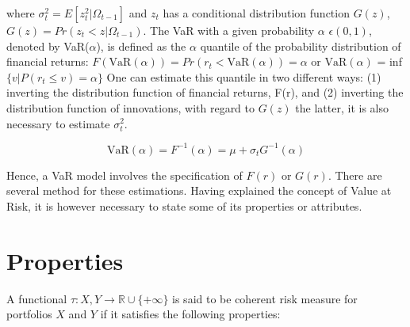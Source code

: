 \documentclass[a4paper,11pt,oneside]{book}
\begin{document}
where $\sigma^2_t = E[z^2_t|\Omega_{t-1}]$ and $z_t$ has a conditional distribution function $G(z)$, $G(z) = Pr(z_t < z|\Omega_{t-1})$. The VaR with a given probability $\alpha$ $\epsilon(0,1)$, denoted by VaR($\alpha$), is defined as the $\alpha$ quantile of the probability distribution of financial returns:\newline
$F(\text{VaR}(\alpha))=Pr(r_t < \text{VaR}(\alpha))=\alpha$ or $\text{VaR}(\alpha)$ = inf$\{v|P(r_t \leq v)= \alpha\}$
\newline\newline
One can estimate this quantile in two different ways: (1) inverting the distribution function of financial returns, F(r), and (2)
inverting the distribution function of innovations, with regard to
$G(z)$ the latter, it is also necessary to estimate $\sigma^2_t$.

\begin{equation}
\text{VaR} (\alpha) = F^{-1}(\alpha) = \mu + \sigma_tG^{-1}(\alpha)
\label{2}
\end{equation}

Hence, a VaR model involves the specification of $F(r)$ or $G(r)$. There are several method for these estimations. Having explained the concept of Value at Risk, it is however necessary to state some of its properties or attributes.



\section{Properties}

A functional $\tau: X,Y \rightarrow \mathbb{R} \cup \{+\infty\}$ is said to be coherent risk measure for portfolios $X$ and $Y$ if it satisfies the following properties:
\newline
\end{document}

